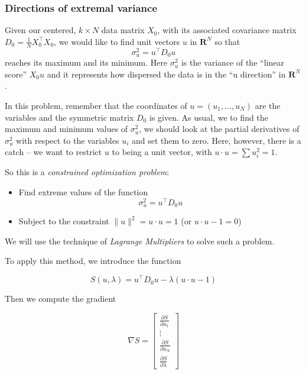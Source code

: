 \documentclass[
]{article}
\providecommand{\tightlist}{%
  \setlength{\itemsep}{0pt}\setlength{\parskip}{0pt}}
\begin{document}
\hypertarget{sec:extremalvariance}{%
\subsubsection{Directions of extremal
variance}\label{sec:extremalvariance}}

Given our centered, \(k\times N\) data matrix \(X_{0}\), with its
associated covariance matrix
\(D_{0}=\frac{1}{N}X_{0}^{\intercal}X_{0}\), we would like to find unit
vectors \(u\) in \(\mathbf{R}^{N}\) so that \[
\sigma_{u}^{2} = u^{\intercal}D_{0}u
\] reaches its maximum and its minimum. Here \(\sigma_{u}^2\) is the
variance of the ``linear score'' \(X_{0}u\) and it represents how
dispersed the data is in the ``u direction'' in \(\mathbf{R}^{N}\).

In this problem, remember that the coordinates of
\(u=(u_1,\ldots, u_{N})\) are the variables and the symmetric matrix
\(D_{0}\) is given. As usual, we to find the maximum and minimum values
of \(\sigma_{u}^{2}\), we should look at the partial derivatives of
\(\sigma_{u}^{2}\) with respect to the variables \(u_{i}\) and set them
to zero. Here, however, there is a catch -- we want to restrict \(u\) to
being a unit vector, with \(u\cdot u =\sum u_{i}^2=1\).

So this is a \emph{constrained optimization problem}:

\begin{itemize}
\tightlist
\item
  Find extreme values of the function \[
  \sigma_{u}^{2} = u^{\intercal}D_{0}u
  \]
\item
  Subject to the constraint \(\|u\|^2 = u\cdot u=1\) (or
  \(u\cdot u-1=0\))
\end{itemize}

We will use the technique of \emph{Lagrange Multipliers} to solve such a
problem.

To apply this method, we introduce the function

\begin{equation}
S(u, \lambda) = u^{\intercal}D_{0}u - \lambda(u\cdot u -1)
\label{eq:lagrange}\end{equation}

Then we compute the gradient

\begin{equation}
\nabla S = \left[\begin{matrix} \frac{\partial S}{\partial u_{1}} \\ \vdots \\ \frac{\partial S}{\partial u_{N}} \\ \frac{\partial S}{\partial \lambda}\end{matrix}\right]
\label{eq:lagrangegradient}\end{equation}
\end{document}
